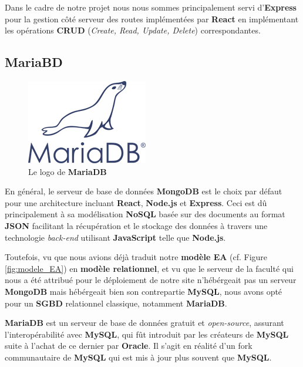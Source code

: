 \documentclass[a4paper,12pt]{report}
\theoremstyle{break}
\theoremstyle{break}
\theoremstyle{break}
\theoremstyle{break}
\theoremstyle{definition}
\theoremstyle{remark}
\begin{document}
Dans le cadre de notre projet nous nous sommes principalement servi d'\textbf{Express} pour la gestion côté serveur des routes implémentées par \textbf{React} en implémentant les opérations \textbf{CRUD} (\textit{Create, Read, Update, Delete}) correspondantes.
\subsection{MariaBD}
\begin{figure}[!ht]
  \centering
  \includegraphics[scale=0.4]{images/mariadb_icon.png}
  \caption{Le logo de \textbf{MariaDB}}
\end{figure}

En général, le serveur de base de données \textbf{MongoDB} est le choix par défaut pour une architecture incluant \textbf{React}, \textbf{Node.js} et \textbf{Express}. Ceci est dû principalement à sa modélisation \textbf{NoSQL} basée sur des documents au format \textbf{JSON} facilitant la récupération et le stockage des données à travers une technologie \textit{back-end} utilisant \textbf{JavaScript} telle que \textbf{Node.js}.

Toutefois, vu que nous avions déjà traduit notre \textbf{modèle EA} (cf. Figure \ref{fig:modele_EA}) en \textbf{modèle relationnel}, et vu que le serveur de la faculté qui nous a été attribué pour le déploiement de notre site n'hébérgeait pas un serveur \textbf{MongoDB} mais hébérgeait bien son contrepartie \textbf{MySQL}, nous avons opté pour un \textbf{SGBD} relationnel classique, notamment \textbf{MariaDB}.

\textbf{MariaDB} est un serveur de base de données gratuit et \textit{open-source}, assurant l'interopérabilité avec \textbf{MySQL}, qui fût introduit par les créateurs de \textbf{MySQL} suite à l'achat de ce dernier par \textbf{Oracle}. Il s'agit en réalité d'un fork communautaire de \textbf{MySQL} qui est mis à jour plus souvent que \textbf{MySQL}.
\end{document}
